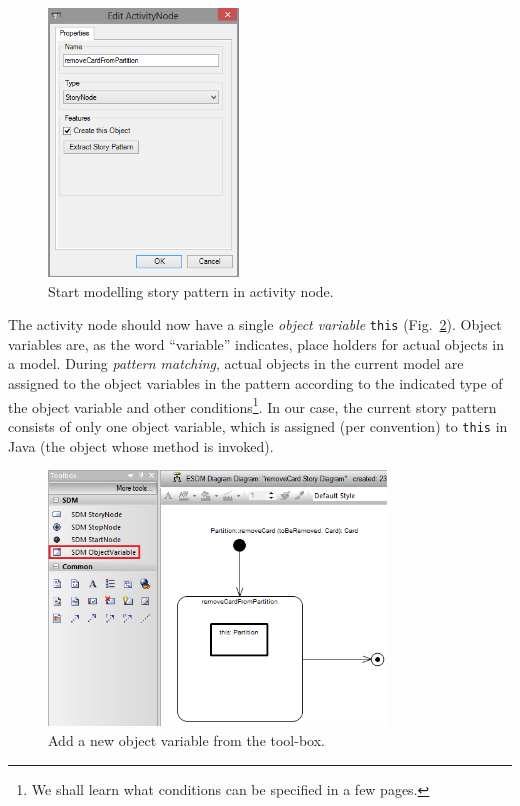 \begin{figure}[htpb]
\begin{center} 
  \includegraphics[width=0.45\textwidth]{pics/sdmBilder/removeCard/sdm07RAW.png}
  \caption{Start modelling story pattern in activity node.}  
  \label{fig:story_pattern}
\end{center}
\end{figure}

The activity node should now have a single \emph{object variable} \texttt{this}
(Fig.~\ref{fig:tool_box}). 
Object variables are, as the word ``variable'' indicates, place holders for actual objects in a model.  
During \emph{pattern matching},
actual objects in the  current model are assigned to the object variables in the pattern according to  the indicated type of the object variable and other conditions\footnote{We shall learn what conditions can be specified in a
few pages.}. 
In our case, the current story pattern consists of only one object variable, which is assigned (per convention) to \texttt{this} in Java (the object whose method is invoked).

\begin{figure}[htp]
\begin{center}
  \includegraphics[width=0.8\textwidth]{pics/sdmBilder/removeCard/sdm09RAW}
  \caption{Add a new object variable from the tool-box.}  
  \label{fig:tool_box}
\end{center}
\end{figure}

